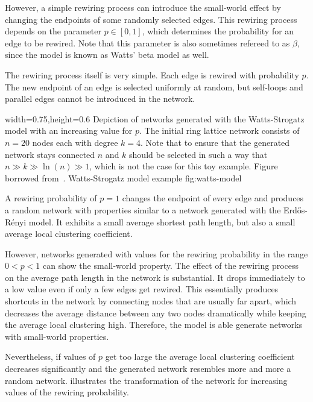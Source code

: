 However, a simple rewiring process can introduce the small-world effect by changing the endpoints of some randomly selected edges.
This rewiring process depends on the parameter \( p \in [0, 1] \), which determines the probability for an edge to be rewired.
Note that this parameter is also sometimes refereed to as \( \beta \), since the model is known as Watts' beta model as well.

The rewiring process itself is very simple.
Each edge is rewired with probability \( p \).
The new endpoint of an edge is selected uniformly at random, but self-loops and parallel edges cannot be introduced in the network.


      {width=0.75\textwidth,height=0.6\textheight}
      {Depiction of networks generated with the Watts-Strogatz model with an increasing value for \( p \). The initial ring lattice network consists of \( n = 20 \) nodes each with degree \( k = 4 \). Note that to ensure that the generated network stays connected \( n \) and \( k \) should be selected in such a way that \( n \gg k \gg \ln(n) \gg 1 \), which is not the case for this toy example. Figure borrowed from~\cite{Watts1998}.}
      {Watts-Strogatz model example}
      {fig:watts-model}


A rewiring probability of \( p = 1 \) changes the endpoint of every edge and produces a random network with properties similar to a network generated with the Erdős-Rényi model.
It exhibits a small average shortest path length, but also a small average local clustering coefficient.

However, networks generated with values for the rewiring probability in the range \( 0 < p < 1 \) can show the small-world property.
The effect of the rewiring process on the average path length in the network is substantial.
It drops immediately to a low value even if only a few edges get rewired.
This essentially produces shortcuts in the network by connecting nodes that are usually far apart, which decreases the average distance between any two nodes dramatically while keeping the average local clustering high.
Therefore, the model is able generate networks with small-world properties.

Nevertheless, if values of \( p \) get too large the average local clustering coefficient decreases significantly and the generated network resembles more and more a random network.
 illustrates the transformation of the network for increasing values of the rewiring probability.


